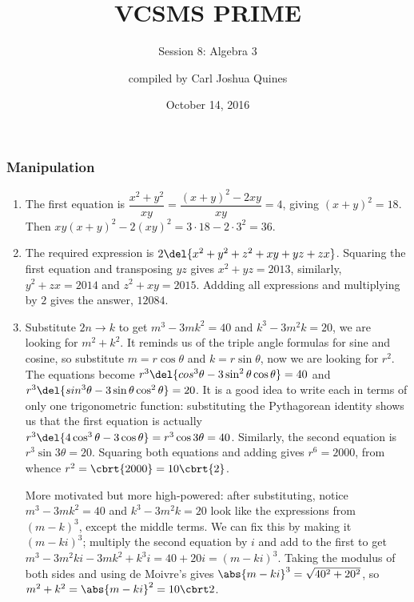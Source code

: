 \documentclass[10pt,paper=letter]{scrartcl}
\begin{document}
\title{VCSMS PRIME}
\subtitle{Session 8: Algebra 3}
\author{compiled by Carl Joshua Quines}
\date{October 14, 2016}

\maketitle

\subsubsection*{Manipulation}

\begin{enumerate}

\item The first equation is $\dfrac{x^2 + y^2}{xy} = \dfrac{(x+y)^2 - 2xy}{xy} = 4$, giving $(x+y)^2 = 18$. Then $xy(x+y)^2 - 2(xy)^2 = 3\cdot18 - 2\cdot3^2 = 36$.

\item The required expression is $2\del{x^2 + y^2 + z^2 + xy + yz + zx}$. Squaring the first equation and transposing $yz$ gives $x^2 + yz = 2013$, similarly, $y^2 + zx = 2014$ and $z^2 + xy = 2015$. Addding all expressions and multiplying by $2$ gives the answer, $12084$.

\item Substitute $2n \to k$ to get $m^3 - 3mk^2 = 40$ and $k^3 - 3m^2k = 20$, we are looking for $m^2 + k^2$. It reminds us of the triple angle formulas for sine and cosine, so substitute $m = r\cos\theta$ and $k = r\sin\theta$, now we are looking for $r^2$. The equations become $r^3\del{cos^3\theta - 3\sin^2\theta\cos\theta} = 40$ and $r^3\del{sin^3\theta - 3\sin\theta\cos^2\theta} = 20$. It is a good idea to write each in terms of only one trigonometric function: substituting the Pythagorean identity shows us that the first equation is actually $r^3\del{4\cos^3\theta  - 3\cos\theta} = r^3\cos3\theta = 40$. Similarly, the second equation is $r^3\sin3\theta = 20$. Squaring both equations and adding gives $r^6 = 2000$, from whence $r^2 = \cbrt{2000} = 10\cbrt{2}$.

More motivated but more high-powered: after substituting, notice $m^3 - 3mk^2 = 40$ and $k^3 - 3m^2k = 20$ look like the expressions from $(m - k)^3$, except the middle terms. We can fix this by making it $(m - ki)^3$; multiply the second equation by $i$ and add to the first to get $m^3 - 3m^2ki - 3mk^2 + k^3i = 40 + 20i = (m - ki)^3$. Taking the modulus of both sides and using de Moivre's gives $\abs{m - ki}^3 = \sqrt{40^2 + 20^2}$, so $m^2 + k^2 = \abs{m - ki}^2 = 10\cbrt2$. 


\end{enumerate}
\end{document}
